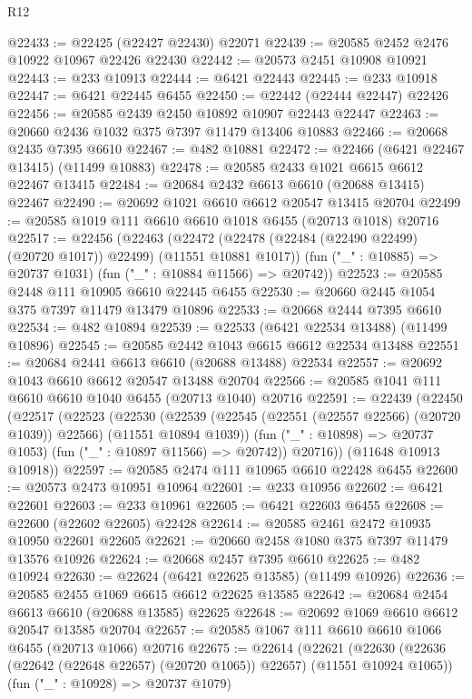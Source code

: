 \begin{lexlean}{R12}
\begin{coremodule}
{{{{{{{{{{{{{{{{{{{{{{{{{{{{{{{{{{{{{{{{{{{{{{{{{{{{{{{{{{{{{{{{{{{{{{{{{{{{{{{{{{@22433 := @22425 (@22427 @22430) @22071
@22439 := @20585 @2452 @2476 @10922 @10967 @22426 @22430
@22442 := @20573 @2451 @10908 @10921
@22443 := @233 @10913
@22444 := @6421 @22443
@22445 := @233 @10918
@22447 := @6421 @22445 @6455
@22450 := @22442 (@22444 @22447) @22426
@22456 := @20585 @2439 @2450 @10892 @10907 @22443 @22447
@22463 := @20660 @2436 @1032 @375 @7397 @11479 @13406 @10883
@22466 := @20668 @2435 @7395 @6610
@22467 := @482 @10881
@22472 := @22466 (@6421 @22467 @13415) (@11499 @10883)
@22478 := @20585 @2433 @1021 @6615 @6612 @22467 @13415
@22484 := @20684 @2432 @6613 @6610 (@20688 @13415) @22467
@22490 := @20692 @1021 @6610 @6612 @20547 @13415 @20704
@22499 := @20585 @1019 @111 @6610 @6610 @1018 @6455 (@20713 @1018) @20716
@22517 := @22456
    (@22463
      (@22472 (@22478 (@22484 (@22490 @22499) (@20720 @1017)) @22499) (@11551 @10881 @1017))
      (fun ("_" : @10885) => @20737 @1031)
      (fun ("_" : @10884 @11566) => @20742))
@22523 := @20585 @2448 @111 @10905 @6610 @22445 @6455
@22530 := @20660 @2445 @1054 @375 @7397 @11479 @13479 @10896
@22533 := @20668 @2444 @7395 @6610
@22534 := @482 @10894
@22539 := @22533 (@6421 @22534 @13488) (@11499 @10896)
@22545 := @20585 @2442 @1043 @6615 @6612 @22534 @13488
@22551 := @20684 @2441 @6613 @6610 (@20688 @13488) @22534
@22557 := @20692 @1043 @6610 @6612 @20547 @13488 @20704
@22566 := @20585 @1041 @111 @6610 @6610 @1040 @6455 (@20713 @1040) @20716
@22591 := @22439
    (@22450
      (@22517
        (@22523
          (@22530
            (@22539 (@22545 (@22551 (@22557 @22566) (@20720 @1039)) @22566) (@11551 @10894 @1039))
            (fun ("_" : @10898) => @20737 @1053)
            (fun ("_" : @10897 @11566) => @20742))
          @20716))
      (@11648 @10913 @10918))
@22597 := @20585 @2474 @111 @10965 @6610 @22428 @6455
@22600 := @20573 @2473 @10951 @10964
@22601 := @233 @10956
@22602 := @6421 @22601
@22603 := @233 @10961
@22605 := @6421 @22603 @6455
@22608 := @22600 (@22602 @22605) @22428
@22614 := @20585 @2461 @2472 @10935 @10950 @22601 @22605
@22621 := @20660 @2458 @1080 @375 @7397 @11479 @13576 @10926
@22624 := @20668 @2457 @7395 @6610
@22625 := @482 @10924
@22630 := @22624 (@6421 @22625 @13585) (@11499 @10926)
@22636 := @20585 @2455 @1069 @6615 @6612 @22625 @13585
@22642 := @20684 @2454 @6613 @6610 (@20688 @13585) @22625
@22648 := @20692 @1069 @6610 @6612 @20547 @13585 @20704
@22657 := @20585 @1067 @111 @6610 @6610 @1066 @6455 (@20713 @1066) @20716
@22675 := @22614
    (@22621
      (@22630 (@22636 (@22642 (@22648 @22657) (@20720 @1065)) @22657) (@11551 @10924 @1065))
      (fun ("_" : @10928) => @20737 @1079)
}}}}}}}}}}}}}}}}}}}}}}}}}}}}}}}}}}}}}}}}}}}}}}}}}}}}}}}}}}}}}}}}}}}}}}}}}}}}}}}}}}
\end{coremodule}
\end{lexlean}
